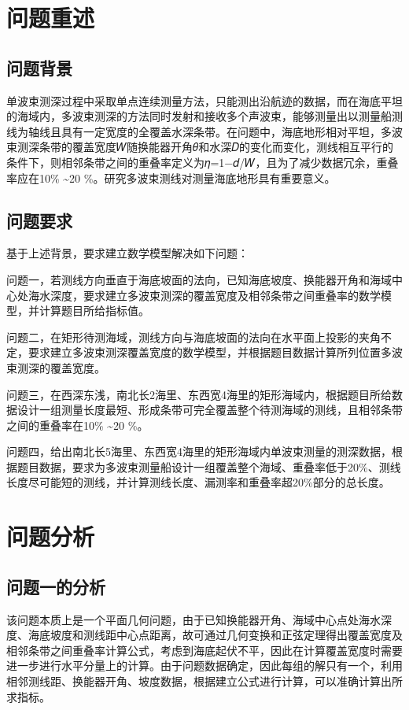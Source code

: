 \documentclass[withoutpreface,bwprint]{cumcmthesis} %
\begin{document}

\section{问题重述}
\subsection{问题背景}
单波束测深过程中采取单点连续测量方法，只能测出沿航迹的数据，而在海底平坦的海域内，多波束测深的方法同时发射和接收多个声波束，能够测量出以测量船测线为轴线且具有一定宽度的全覆盖水深条带。在问题中，海底地形相对平坦，多波束测深条带的覆盖宽度𝑊随换能器开角𝜃和水深𝐷的变化而变化，测线相互平行的条件下，则相邻条带之间的重叠率定义为𝜂=1−𝑑/𝑊，且为了减少数据冗余，重叠率应在10\% \textasciitilde 20 \%。研究多波束测线对测量海底地形具有重要意义。
\subsection{问题要求}
基于上述背景，要求建立数学模型解决如下问题：

问题一，若测线方向垂直于海底坡面的法向，已知海底坡度、换能器开角和海域中心处海水深度，要求建立多波束测深的覆盖宽度及相邻条带之间重叠率的数学模型，并计算题目所给指标值。

问题二，在矩形待测海域，测线方向与海底坡面的法向在水平面上投影的夹角不定，要求建立多波束测深覆盖宽度的数学模型，并根据题目数据计算所列位置多波束测深的覆盖宽度。

问题三，在西深东浅，南北长2海里、东西宽4海里的矩形海域内，根据题目所给数据设计一组测量长度最短、形成条带可完全覆盖整个待测海域的测线，且相邻条带之间的重叠率在10\% \textasciitilde 20 \%。

问题四，给出南北长5海里、东西宽4海里的矩形海域内单波束测量的测深数据，根据题目数据，要求为多波束测量船设计一组覆盖整个海域、重叠率低于20\%、测线长度尽可能短的测线，并计算测线长度、漏测率和重叠率超20\%部分的总长度。
\section{问题分析}
\subsection{问题一的分析}
该问题本质上是一个平面几何问题，由于已知换能器开角、海域中心点处海水深度、海底坡度和测线距中心点距离，故可通过几何变换和正弦定理得出覆盖宽度及相邻条带之间重叠率计算公式，考虑到海底起伏不平，因此在计算覆盖宽度时需要进一步进行水平分量上的计算。由于问题数据确定，因此每组的解只有一个，利用相邻测线距、换能器开角、坡度数据，根据建立公式进行计算，可以准确计算出所求指标。
\end{document}
